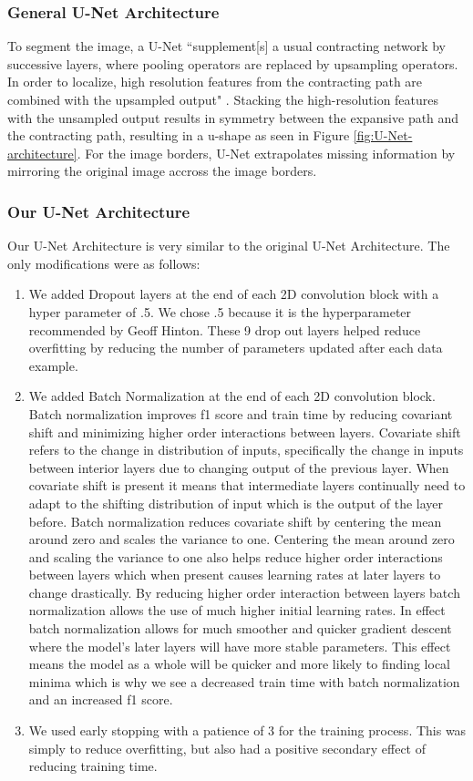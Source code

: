\documentclass[paper=letter, fontsize=12pt]{article}
\numberwithin{equation}{section} %
\numberwithin{figure}{section} %
\numberwithin{table}{section} %
\begin{document}
\subsubsection{General U-Net Architecture}
To segment the image, a U-Net ``supplement[s] a usual contracting network by
successive layers, where pooling operators are replaced by upsampling
operators. In order to localize, high resolution features from the contracting
path are combined with the upsampled output" \cite{unet}. Stacking
the high-resolution features with the unsampled output results in symmetry
between the expansive path and the contracting path, resulting in a u-shape as
seen in Figure \ref{fig:U-Net-architecture}. For the image borders, U-Net
extrapolates missing information by mirroring the original image accross the
image borders.

\subsubsection{Our U-Net Architecture}
Our U-Net Architecture is very similar to the original U-Net Architecture. The
only modifications were as follows:
\begin{enumerate}
  \item We added Dropout layers at the end of each 2D convolution block with a
  hyper parameter of .5. We chose .5 because it is the hyperparameter recommended
  by Geoff Hinton. These 9 drop out layers helped reduce overfitting by reducing
  the number of parameters updated after each data example.
  \item We added Batch Normalization at the end of each 2D convolution block. Batch normalization
  improves f1 score and train time by reducing covariant shift and minimizing higher order
  interactions between layers. Covariate shift refers to the change in distribution of inputs,
  specifically the change in inputs between interior layers due to changing output of the previous
  layer. When covariate shift is present it means that intermediate layers continually need
  to adapt to the shifting distribution of input which is the output of the layer before.
  Batch normalization reduces covariate shift by centering the mean around zero and scales
  the variance to one. Centering the mean around zero and scaling the variance to one also
  helps reduce higher order interactions between layers which when present causes learning
  rates at later layers to change drastically. By reducing higher order interaction between
  layers batch normalization allows the use of much higher initial learning rates. In effect
  batch normalization allows for much smoother and quicker gradient descent where the model’s
  later layers will have more stable parameters. This effect means the model as a whole will
  be quicker and more likely to finding local minima which is why we see a decreased train
  time with batch normalization and an increased f1 score.

  \item We used early stopping with a patience of 3 for the training process. This
  was simply to reduce overfitting, but also had a positive secondary effect of
  reducing training time.
\end{enumerate}
\end{document}
